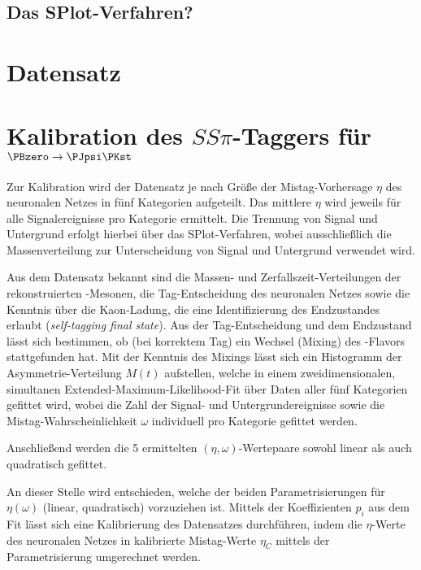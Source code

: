 
\subsection{Das SPlot-Verfahren?}

\section{Datensatz}


\section{\texorpdfstring{Kalibration des $SS\pi$-Taggers für $\PBzero \to \PJpsi \PKst$}{Kalibration des SSpi-Taggers für B0 -> JpsiKst}}

Zur Kalibration wird der Datensatz je nach Größe der Mistag-Vorhersage $η$ des neuronalen Netzes in fünf Kategorien aufgeteilt.
Das mittlere $η$ wird jeweils für alle Signalereignisse pro Kategorie ermittelt.
Die Trennung von Signal und Untergrund erfolgt hierbei über das SPlot-Verfahren, wobei ausschließlich die Massenverteilung zur Unterscheidung von Signal und Untergrund verwendet wird.

Aus dem Datensatz bekannt sind die Massen- und Zerfallszeit-Verteilungen der rekonstruierten \PB-Mesonen, die Tag-Entscheidung des neuronalen Netzes sowie die Kenntnis über die Kaon-Ladung, die eine Identifizierung des Endzustandes erlaubt (\emph{self-tagging final state}).
Aus der Tag-Entscheidung und dem Endzustand lässt sich bestimmen, ob (bei korrektem Tag) ein Wechsel (Mixing) des \Pqb-Flavors stattgefunden hat.
Mit der Kenntnis des Mixings lässt sich ein Histogramm der Asymmetrie-Verteilung $M(t)$ aufstellen, welche in einem zweidimensionalen, simultanen Extended-Maximum-Likelihood-Fit über Daten aller fünf Kategorien gefittet wird, wobei die Zahl der Signal- und Untergrundereignisse sowie die Mistag-Wahrscheinlichkeit $ω$ individuell pro Kategorie gefittet werden.

Anschließend werden die 5 ermittelten $(η, ω)$-Wertepaare sowohl linear als auch quadratisch gefittet.

An dieser Stelle wird entschieden, welche der beiden Parametrisierungen für $η(ω)$ (linear, quadratisch) vorzuziehen ist.
Mittels der Koeffizienten $p_i$ aus dem Fit lässt sich eine Kalibrierung des Datensatzes durchführen, indem die $η$-Werte des neuronalen Netzes in kalibrierte Mistag-Werte $η_C$ mittels der Parametrisierung umgerechnet werden.

